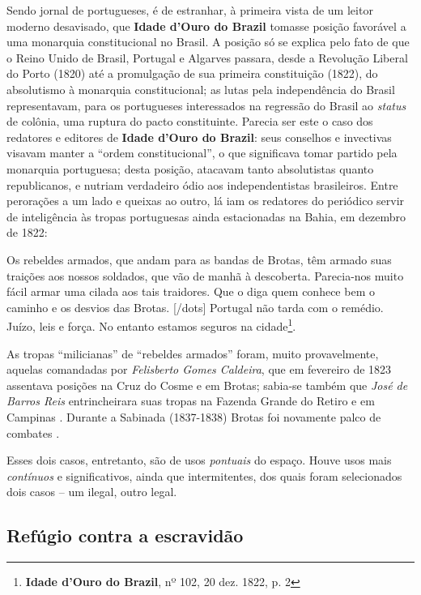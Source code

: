 Sendo jornal de portugueses, é de estranhar, à primeira vista de um leitor moderno desavisado, que \textbf{Idade d'Ouro do Brazil} tomasse posição favorável a uma monarquia constitucional no Brasil. A posição só se explica pelo fato de que o Reino Unido de Brasil, Portugal e Algarves passara, desde a Revolução Liberal do Porto (1820) até a promulgação de sua primeira constituição (1822), do absolutismo à monarquia constitucional; as lutas pela independência do Brasil representavam, para os portugueses interessados na regressão do Brasil ao \textit{status} de colônia, uma ruptura do pacto constituinte. Parecia ser este o caso dos redatores e editores de \textbf{Idade d'Ouro do Brazil}: seus conselhos e invectivas visavam manter a ``ordem constitucional'', o que significava tomar partido pela monarquia portuguesa; desta posição, atacavam tanto absolutistas quanto republicanos, e nutriam verdadeiro ódio aos independentistas brasileiros. Entre perorações a um lado e queixas ao outro, lá iam os redatores do periódico servir de inteligência às tropas portuguesas ainda estacionadas na Bahia, em dezembro de 1822:

\begin{citacao}
Os rebeldes armados, que andam para as bandas de Brotas, têm armado suas traições aos nossos soldados, que vão de manhã à descoberta. Parecia-nos muito fácil armar uma cilada aos tais traidores. Que o diga quem conhece bem o caminho e os desvios das Brotas. [/dots] Portugal não tarda com o remédio. Juízo, leis e força. No entanto estamos seguros na cidade\footnote{\textbf{Idade d'Ouro do Brazil}, nº 102, 20 dez. 1822, p. 2}.
\end{citacao}

As tropas ``milicianas'' de ``rebeldes armados'' foram, muito provavelmente, aquelas comandadas por \textit{Felisberto Gomes Caldeira}, que em fevereiro de 1823 assentava posições na Cruz do Cosme e em Brotas; sabia-se também que \textit{José de Barros Reis} entrincheirara suas tropas na Fazenda Grande do Retiro e em Campinas \cite[p.~248]{ruy_camara_1953}. Durante a Sabinada (1837-1838) Brotas foi novamente palco de combates \cite[p.~536]{ruy_politica_1949}.

Esses dois casos, entretanto, são de usos \textit{pontuais} do espaço. Houve usos mais \textit{contínuos} e significativos, ainda que intermitentes, dos quais foram selecionados dois casos -- um ilegal, outro legal.

\subsection{Refúgio contra a escravidão}\label{subsec:refugioescrav}

